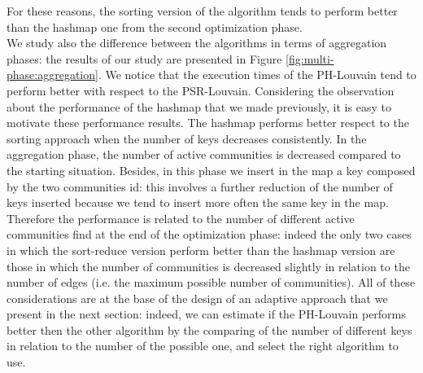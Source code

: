 For these reasons, the sorting version of the algorithm tends to perform better than the hashmap one from the second optimization phase. \\
We study also the difference between the algorithms in terms of aggregation phases: the results of our study are presented in Figure \ref{fig:multi-phase:aggregation}.
We notice that the execution times of the PH-Louvain tend to perform better with respect to the PSR-Louvain. Considering the observation about the performance of the hashmap that we made previously, it is easy to motivate these performance results. The hashmap performs better respect to the sorting approach when the number of keys decreases consistently. In the aggregation phase, the number of active communities is decreased compared to the starting situation. Besides, in this phase we insert in the map a key composed by the two communities id: this involves a further reduction of the number of keys inserted because we tend to insert more often the same key in the map. Therefore the performance is related to the number of different active communities find at the end of the optimization phase: indeed the only two cases in which the sort-reduce version perform better than the hashmap version are those in which the number of communities is decreased slightly in relation to the number of edges (i.e. the maximum possible number of communities).
All of these considerations are at the base of the design of an adaptive approach that we present in the next section: indeed, we can estimate if the PH-Louvain performs better then the other algorithm by the comparing of the number of different keys in relation to the number of the possible one, and select the right algorithm to use.	
